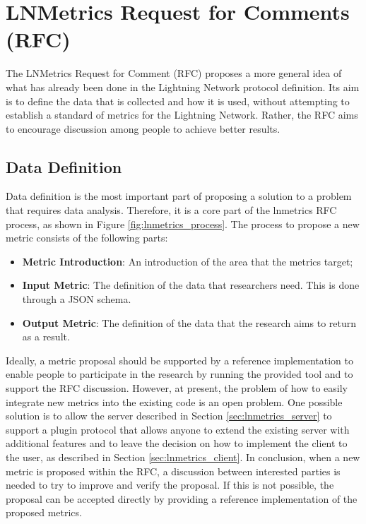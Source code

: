 \section{LNMetrics Request for Comments (RFC)}

The LNMetrics Request for Comment (RFC) proposes a more general idea of what has 
already been done in the Lightning Network protocol definition. Its aim is to define
the data that is collected and how it is used, without attempting to establish a standard
of metrics for the Lightning Network. Rather, the RFC aims to encourage discussion
among people to achieve better results.

\subsection{Data Definition}
\label{sec:data_definition}

Data definition is the most important part of proposing a solution to a 
problem that requires data analysis. Therefore, it is a core part of the 
lnmetrics RFC process, as shown in Figure \ref{fig:lnmetrics_process}. The 
process to propose a new metric consists of the following parts:

\begin{itemize}
    \item \textbf{Metric Introduction}: An introduction of the area that the metrics target;
    \item \textbf{Input Metric}: The definition of the data that researchers need. This is done through a JSON schema.
    \item \textbf{Output Metric}: The definition of the data that the research aims to return as a result.
\end{itemize}

Ideally, a metric proposal should be supported by a reference implementation 
to enable people to participate in the research by running the provided tool and
to support the RFC discussion. However, at present, the problem of how to easily 
integrate new metrics into the existing code is an open problem. One possible 
solution is to allow the server described in Section \ref{sec:lnmetrics_server} 
to support a plugin protocol that allows anyone to extend the existing server 
with additional features and to leave the decision on how to implement the client 
to the user, as described in Section \ref{sec:lnmetrics_client}. In conclusion, 
when a new metric is proposed within the RFC, a discussion between interested 
parties is needed to try to improve and verify the proposal. If this is not 
possible, the proposal can be accepted directly by providing a reference 
implementation of the proposed metrics.

